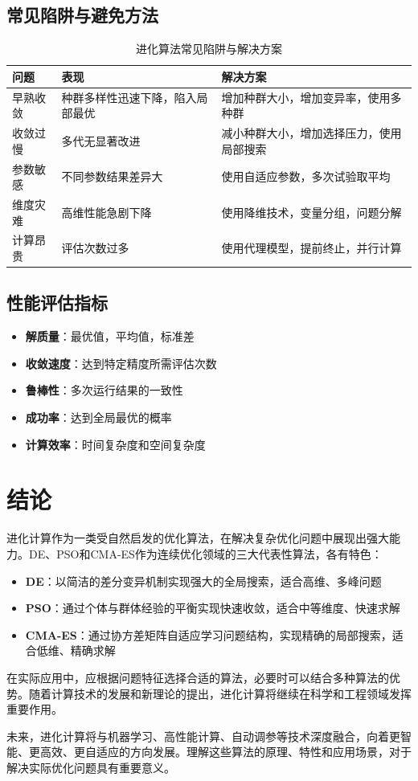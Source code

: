 \subsection{常见陷阱与避免方法}

\begin{table}[H]
\centering
\caption{进化算法常见陷阱与解决方案}
\begin{tabular}{p{}p{}p{}}
\toprule
\textbf{问题} & \textbf{表现} & \textbf{解决方案} \\
\midrule
早熟收敛 & 种群多样性迅速下降，陷入局部最优 & 增加种群大小，增加变异率，使用多种群 \\
\hline
收敛过慢 & 多代无显著改进 & 减小种群大小，增加选择压力，使用局部搜索 \\
\hline
参数敏感 & 不同参数结果差异大 & 使用自适应参数，多次试验取平均 \\
\hline
维度灾难 & 高维性能急剧下降 & 使用降维技术，变量分组，问题分解 \\
\hline
计算昂贵 & 评估次数过多 & 使用代理模型，提前终止，并行计算 \\
\bottomrule
\end{tabular}
\end{table}

\subsection{性能评估指标}

\begin{itemize}
    \item \textbf{解质量}：最优值，平均值，标准差
    \item \textbf{收敛速度}：达到特定精度所需评估次数
    \item \textbf{鲁棒性}：多次运行结果的一致性
    \item \textbf{成功率}：达到全局最优的概率
    \item \textbf{计算效率}：时间复杂度和空间复杂度
\end{itemize}

\section{结论}

进化计算作为一类受自然启发的优化算法，在解决复杂优化问题中展现出强大能力。DE、PSO和CMA-ES作为连续优化领域的三大代表性算法，各有特色：

\begin{itemize}
    \item \textbf{DE}：以简洁的差分变异机制实现强大的全局搜索，适合高维、多峰问题
    \item \textbf{PSO}：通过个体与群体经验的平衡实现快速收敛，适合中等维度、快速求解
    \item \textbf{CMA-ES}：通过协方差矩阵自适应学习问题结构，实现精确的局部搜索，适合低维、精确求解
\end{itemize}

在实际应用中，应根据问题特征选择合适的算法，必要时可以结合多种算法的优势。随着计算技术的发展和新理论的提出，进化计算将继续在科学和工程领域发挥重要作用。

未来，进化计算将与机器学习、高性能计算、自动调参等技术深度融合，向着更智能、更高效、更自适应的方向发展。理解这些算法的原理、特性和应用场景，对于解决实际优化问题具有重要意义。